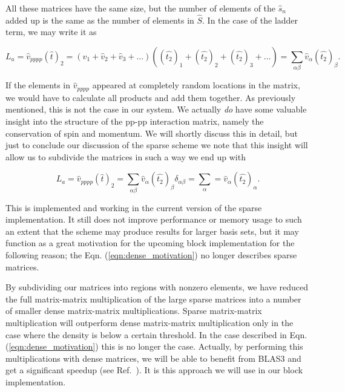 All these matrices have the same size, but the number of elements of the $\hat{s}_n$ added up is the same as the number of elements in $\hat{S}$. In the case of the ladder term, we may write it as

\begin{equation}
L_a = \hat{v}_{pppp} (\hat{t})_2 = (\hat{v}_1 + \hat{v}_2 + \hat{v}_3 + ...) ((\hat{t_2})_1 + (\hat{t_2})_2 + (\hat{t_2})_3 + ...) = \sum_{\alpha \beta} \hat{v}_\alpha (\hat{t_2})_\beta.
\end{equation}

If the elements in $\hat{v}_{pppp}$ appeared at completely random locations in the matrix, we would have to calculate all products and add them together. As previously mentioned, this is not the case in our system. We actually  \emph{do} have some valuable insight into the structure of the pp-pp interaction matrix, namely the conservation of spin and momentum. We will shortly discuss this in detail, but just to conclude our discussion of the sparse scheme we note that this insight will allow us to subdivide the matrices in such a way we end up with

\begin{equation}
L_a = \hat{v}_{pppp} (\hat{t})_2 =  \sum_{\alpha \beta} \hat{v}_\alpha (\hat{t_2})_\beta \delta_{\alpha \beta } = \sum_{\alpha} = \hat{v}_\alpha (\hat{t_2})_\alpha .
\label{eqn:dense_motivation}
\end{equation}

This is implemented and working in the current version of the sparse implementation. It still does not improve performance or memory usage to such an extent that the scheme may produce results for larger basis sets, but it may function as a great motivation for the upcoming block implementation for the following reason; the Eqn. (\ref{eqn:dense_motivation}) no longer describes sparse matrices. 

By subdividing our matrices into regions with nonzero elements, we have reduced the full matrix-matrix multiplication of the large sparse matrices into a number of smaller dense matrix-matrix multiplications. Sparse matrix-matrix multiplication will outperform dense matrix-matrix multiplication only in the case where the density is below a certain threshold. In the case described in Eqn. (\ref{eqn:dense_motivation}) this is no longer the case. Actually, by performing this multiplications with dense matrices, we will be able to benefit from BLAS3 and get a significant speedup (see Ref.~\cite{Karniadakis}).  It is this approach we will use in our block implementation.


